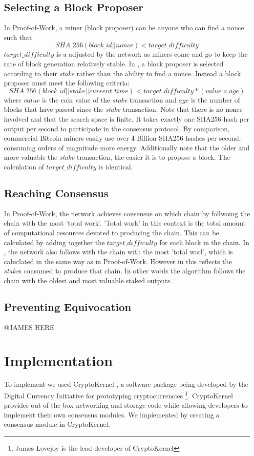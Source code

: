 \documentclass{article}
\begin{document}
\subsection{Selecting a Block Proposer}
In Proof-of-Work, a miner (block proposer) can be anyone who can find a nonce such that 
$$SHA\_256(block\_id || nonce) < target\_difficulty$$
$target\_difficulty$ is a adjusted by the network as miners come and go to keep the rate of block generation relatively stable. 
In \coin, a block proposer is selected according to their \textit{stake} rather than the ability to find a nonce. Instead a block proposer must meet the following criteria:  
$$SHA\_256(block\_id || stake || current\_time) < target\_difficulty * (value \times age) $$ 
where $value$ is the coin value of the \textit{stake} transaction and $age$ is the number of blocks that have passed since the \textit{stake} transaction. Note that there is no nonce involved and that the search space is finite. It takes exactly one SHA256 hash per output per second to participate in the consensus protocol. By comparison, commercial Bitcoin miners easily use over 4 Billion SHA256 hashes per second, consuming orders of magnitude more energy. Additionally note that the older and more valuable the \textit{stake} transaction, the easier it is to propose a block. The calculation of $target\_difficulty$ is identical. 

\subsection{Reaching Consensus}
In Proof-of-Work, the network achieves consensus on which chain by follwoing the chain with the most 'total work'. 'Total work' in this context is the total amount of computational resources devoted to producing the chain. This can be calculated by adding together the $target\_difficulty$ for each block in the chain. In \coin, the network also follows with the chain with the most 'total worl', which is caluclated in the same way as in Proof-of-Work. However in \coin this reflects the \textit{stake}s consumed to produce that chain. In other words the algorithm follows the chain with the oldest and most valuable staked outputs.  

\subsection{Preventing Equivocation}
@JAMES HERE 

\section{Implementation}
To implement \coin we used CryptoKernel \cite{ck}, a software package being developed by the Digital Currency Initiative for prototyping cryptocurrencies \footnote{James Lovejoy is the lead developer of CryptoKernel}. CryptoKernel provides out-of-the-box networking and storage code while allowing developers to implement their own consensus modules. We implemented \coin by creating a consensus module in CryptoKernel.
\end{document}
